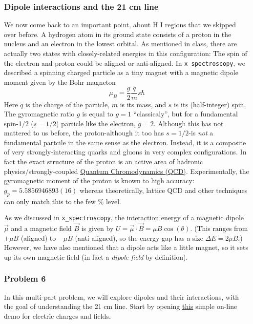 \documentclass[11pt]{article}
\begin{document}
\subsubsection{Dipole interactions and the 21 cm
line}\label{dipole-interactions-and-the-21-cm-line}

We now come back to an important point, about H I regions that we
skipped over before. A hydrogen atom in its ground state consists of a
proton in the nucleus and an electron in the lowest orbital. As
mentioned in class, there are actually two states with closely-related
energies in this configuration: The spin of the electron and proton
could be aligned or anti-aligned. In \texttt{x\_spectroscopy}, we
described a spinning charged particle as a tiny magnet with a magnetic
dipole moment given by the Bohr magneton \[
\mu_B= \frac g2 \frac qm  s\hbar \tag{5}
\] Here \(q\) is the charge of the particle, \(m\) is its mass, and
\(s\) is its (half-integer) spin. The gyromagnetic ratio \(g\) is equal
to \(g=1\) ``classicaly'', but for a fundamental spin-1/2 (\(s=1/2\))
particle like the electron, \(g=2\). Although this has not mattered to
us before, the proton-although it too has \(s=1/2\)-is \emph{not} a
fundamental partcile in the same sense as the electron. Instead, it is a
composite of very strongly-interacting quarks and gluons in very complex
configurations. In fact the exact structure of the proton is an active
area of hadronic physics/strongly-coupled
\href{https://en.wikipedia.org/wiki/Quantum_chromodynamics}{Quantum
Chromodynamics (QCD)}. Experimentally, the gyromagnetic moment of the
proton is known to high accuracy: \(g_p = 5.5856946893(16)\) whereas
theoretically, lattice QCD and other techniques can only match this to
the few \% level.

As we discussed in \texttt{x\_spectroscopy}, the interaction energy of a
magnetic dipole \(\vec \mu\) and a magnetic field \(\vec B\) is given by
\(U=\vec \mu\cdot \vec B=\mu B \cos (\theta)\). (This ranges from
\(+\mu B\) (aligned) to \(-\mu B\) (anti-aligned), so the energy gap has
a size \(\Delta E=2\mu B\).) However, we have also mentioned that a
dipole acts like a little magnet, so it sets up its own magnetic field
(in fact a \emph{dipole field} by definition).

 
\subsubsection{Problem 6}\label{problem-6}

In this multi-part problem, we will explore dipoles and their
interactions, with the goal of understanding the 21 cm line. Start by
opening
\href{https://demo-clix.tiss.ac.in/phet/sims/html/charges-and-fields/latest/charges-and-fields_all.html?locale=en}{this}
simple on-line demo for electric charges and fields.
\end{document}

